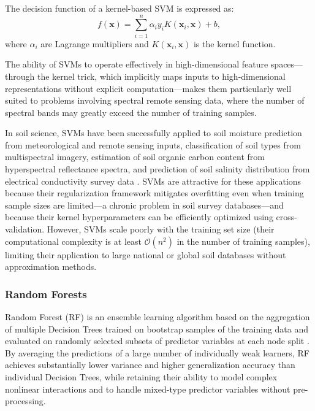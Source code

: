 \documentclass[land,review,accept,pdftex,oneauthor]{Definitions/mdpi}
\begin{document}
The decision function of a kernel-based SVM is expressed as:
\begin{equation}
f(\mathbf{x})=\sum_{i=1}^{n}\alpha_i y_i K(\mathbf{x}_i,\mathbf{x})+b,
\end{equation}
where $\alpha_i$ are Lagrange multipliers and $K(\mathbf{x}_i,\mathbf{x})$ is the kernel function.

The ability of SVMs to operate effectively in high-dimensional feature spaces---through the kernel trick, which implicitly maps inputs to high-dimensional representations without explicit computation---makes them particularly well suited to problems involving spectral remote sensing data, where the number of spectral bands may greatly exceed the number of training samples.

In soil science, SVMs have been successfully applied to soil moisture prediction from meteorological and remote sensing inputs, classification of soil types from multispectral imagery, estimation of soil organic carbon content from hyperspectral reflectance spectra, and prediction of soil salinity distribution from electrical conductivity survey data \citep{viscarra2010predictive,Lemenkova202411}. SVMs are attractive for these applications because their regularization framework mitigates overfitting even when training sample sizes are limited---a chronic problem in soil survey databases---and because their kernel hyperparameters can be efficiently optimized using cross-validation. However, SVMs scale poorly with the training set size (their computational complexity is at least $\mathcal{O}(n^2)$ in the number of training samples), limiting their application to large national or global soil databases without approximation methods.

\subsubsection{Random Forests}

Random Forest (RF) is an ensemble learning algorithm based on the aggregation of multiple Decision Trees trained on bootstrap samples of the training data and evaluated on randomly selected subsets of predictor variables at each node split \citep{Breiman2001,BelgiuDragut2016}. By averaging the predictions of a large number of individually weak learners, RF achieves substantially lower variance and higher generalization accuracy than individual Decision Trees, while retaining their ability to model complex nonlinear interactions and to handle mixed-type predictor variables without pre-processing.
\end{document}
